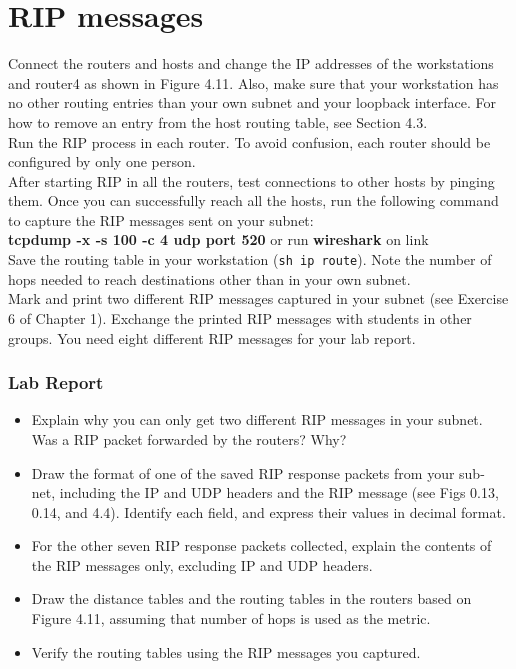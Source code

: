 \documentclass{../UTNetLab}
\begin{document}
\section{RIP messages}
    Connect the routers and hosts and change the IP addresses of the workstations and router4 as shown in Figure 4.11.
    Also, make sure that your workstation has no other routing entries than your own subnet and your loopback interface.
    For how to remove an entry from the host routing table, see Section 4.3. \\
    Run the RIP process in each router.
    To avoid confusion, each router should be configured by only one person. \\
    After starting RIP in all the routers, test connections to other hosts by pinging them.
    Once you can successfully reach all the hosts, run the following command to capture the RIP messages sent on your subnet: \\
    \textbf{tcpdump -x -s 100 -c 4 udp port 520} or run \textbf{wireshark} on link \\
    Save the routing table in your workstation (\texttt{sh ip route}).
    Note the number of hops needed to reach destinations other than in your own subnet. \\
    Mark and print two different RIP messages captured in your subnet (see Exercise 6 of Chapter 1).
    Exchange the printed RIP messages with students in other groups.
    You need eight different RIP messages for your lab report.
    \subsubsection*{Lab Report}
    \begin{itemize}
        \setlength{\itemindent}{0pt}
        \item Explain why you can only get two different RIP messages in your subnet.
        Was a RIP packet forwarded by the routers?
        Why?
        \item Draw the format of one of the saved RIP response packets from your sub- net, including the IP and UDP headers and the RIP message (see Figs 0.13, 0.14, and 4.4). Identify each field, and express their values in decimal format.
        \item For the other seven RIP response packets collected, explain the contents of the RIP messages only, excluding IP and UDP headers.
    \end{itemize}
    \begin{itemize}
        \setlength{\itemindent}{0pt}
        \item Draw the distance tables and the routing tables in the routers based on Figure 4.11, assuming that number of hops is used as the metric.
        \item Verify the routing tables using the RIP messages you captured.
    \end{itemize}
\end{document}
